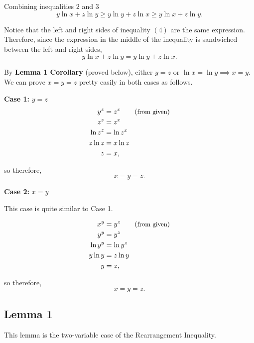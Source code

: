 \documentclass[12pt]{article}
\begin{document}
\begin{solution}{2}
    Combining inequalities $2$ and $3$
    \begin{equation*}
        y\ln x + z\ln y \ge y\ln y + z\ln x \ge y\ln x + z\ln y. \tag{4}
    \end{equation*}
    
    Notice that the left and right sides of inequality $(4)$ are the same expression.
    Therefore, since the expression in the middle of the inequality is sandwiched between the left and right sides,
    \begin{equation*}
        y\ln x + z\ln y = y\ln y + z\ln x.
    \end{equation*}

    By \textbf{Lemma 1 Corollary} (proved below), either $y=z$ or $\ln x = \ln y \implies x=y$. We can prove $x=y=z$ pretty easily in both cases as follows.

    \textbf{Case 1:} $y=z$
    \begin{align*}
        y^z &= z^x \tag{\small{from given}} \\
        z^z &= z^x \\
        \ln{z^z} &= \ln{z^x} \\
        z\ln z &= x\ln z\\
        z &= x,
    \end{align*}
    
    so therefore,
    \begin{equation*}
        x=y=z. \tag*{\qed}
    \end{equation*}

    \pagebreak
    \textbf{Case 2:} $x=y$

    This case is quite similar to Case 1.
    
    \begin{align*}
        x^y &= y^z \tag{\small{from given}} \\
        y^y &= y^z \\
        \ln{y^y} &= \ln{y^z} \\
        y\ln y &= z\ln y \\
        y &= z,
    \end{align*}
    
    so therefore,
    \begin{equation*}
        x=y=z. \tag*{\qed}
    \end{equation*}
    
    \subsection*{Lemma 1}
    This lemma is the two-variable case of the Rearrangement Inequality.
    

\end{solution}
\end{document}
